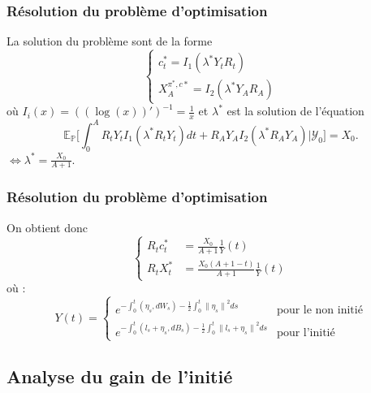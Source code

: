 \documentclass{beamer}
\begin{document}
\begin{frame}
\frametitle{Résolution du problème d'optimisation}
La solution du problème sont de la forme 
\begin{equation*}
\begin{cases} c^*_t = I_1 (\lambda^*Y_t R_t)\\
X^{\pi^*, c*}_A = I_2 (\lambda^* Y_A R_A)
\end{cases}
\end{equation*}
où $I_i(x) = ((\log(x))')^{-1} = \frac{1}{x}$ et $
\lambda^*$ est la solution de l'équation 
\begin{equation*}
\mathbb{E}_{\mathbb{P}} \Big[ \int_0^A R_t Y_t I_1(\lambda^* R_t Y_t)dt + R_A Y_A I_2(\lambda^* R_A Y_A ) | \mathcal{Y}_0 \Big] = X_0.
\end{equation*}
$ \Leftrightarrow \lambda^* = \frac{X_0}{A +1}$.
\end{frame}

\begin{frame}
\frametitle{Résolution du problème d'optimisation}
On obtient donc
\begin{equation*}
\begin{cases}
R_t c_t^* &= \frac{X_0}{A + 1} \frac{1}{Y} \left( t \right) \\
R_t X_t^* &= \frac{X_0 \left( A + 1 - t \right)}{A + 1} \frac{1}{Y} \left( t \right)
\end{cases}
\end{equation*}
où : 
\begin{displaymath}
Y \left( t \right) = 
\begin{cases}
e^{- \int_{0}^{t} \left( \eta_s, dW_{s} \right)-\frac{1}{2} \int_{0}^{t} {\| \eta_s \|}^{2} ds} & \text{pour le non initié} \\
e^{- \int_{0}^{t} \left( l_{s} + \eta_s, dB_{s} \right) - \frac{1}{2} \int_{0}^{t} {\| l_{s} + \eta_s \|}^{2} ds} & \text{pour l'initié}
\end{cases}
\end{displaymath}
\end{frame}
\subsection{Analyse du gain de l'initié}
\end{document}
